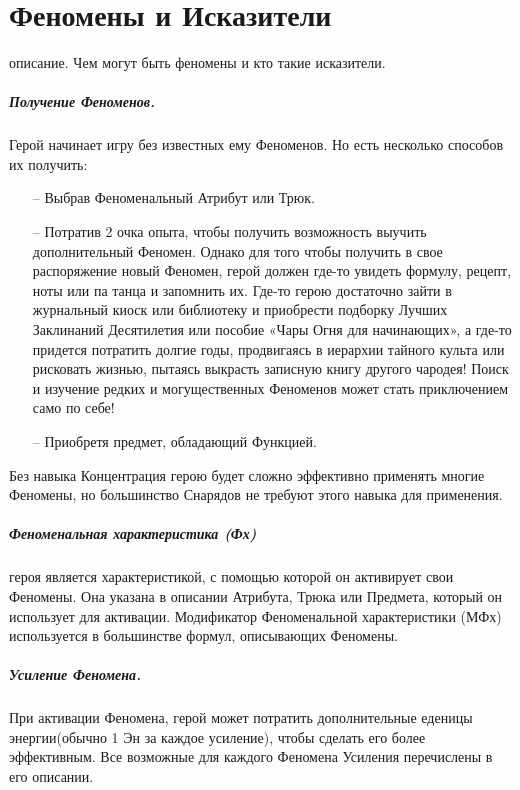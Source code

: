 \chapter{Феномены и Исказители}
\tbd описание. Чем могут быть феномены и кто такие исказители.
\paragraph{Получение Феноменов.} Герой начинает игру без известных ему Феноменов. Но есть несколько способов их получить:
\begin{itemize}
\item[--] Выбрав Феноменальный Атрибут или Трюк.
\item[--] Потратив 2 очка опыта, чтобы получить возможность выучить дополнительный Феномен.
\newline
Однако для того чтобы получить в свое распоряжение новый Феномен, герой должен где-то увидеть формулу, рецепт, ноты или па танца и запомнить их. Где-то герою достаточно зайти в журнальный киоск или библиотеку и приобрести подборку Лучших Заклинаний Десятилетия или пособие «Чары Огня для начинающих», а где-то придется потратить долгие годы, продвигаясь в иерархии тайного культа или рисковать жизнью, пытаясь выкрасть записную книгу другого чародея! Поиск и изучение редких и могущественных Феноменов может стать приключением само по себе!
\item[--] Приобретя предмет, обладающий Функцией.
\end{itemize}
\begin{tcolorbox}
Без навыка Концентрация герою будет сложно эффективно применять многие Феномены, но большинство Снарядов не требуют этого навыка для применения.
\end{tcolorbox}
\paragraph{Феноменальная характеристика (Фх)} героя является характеристикой, с помощью которой он активирует свои Феномены. Она указана в описании Атрибута, Трюка или Предмета, который он использует для активации. Модификатор Феноменальной характеристики (МФх) используется в большинстве формул, описывающих Феномены.
\paragraph{Усиление Феномена.} При активации Феномена, герой может потратить дополнительные еденицы энергии(обычно 1 Эн за каждое усиление), чтобы сделать его более эффективным. Все возможные для каждого Феномена Усиления перечислены в его описании.
